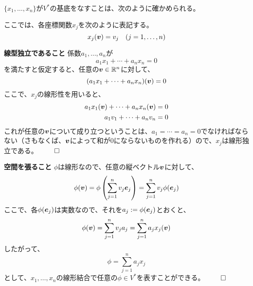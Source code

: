 \documentclass[../../../topic_linear-algebra]{subfiles}
\begin{document}
\begin{handout}[補足：なぜ基底といえるのか]
  $\{ x_1, \dots, x_n \}$が$V^*$の基底をなすことは、次のように確かめられる。
  
  ここでは、各座標関数$x_j$を次のように表記する。
    \begin{equation*}
      x_j(\vb*{v}) = v_j \quad (j = 1, \dots, n)
    \end{equation*}
  
  \begin{subpattern}{\bfseries 線型独立であること}
    係数$a_1, \dots, a_n$が
    \begin{equation*}
      a_1 x_1 + \cdots + a_n x_n = 0
    \end{equation*}
    を満たすと仮定すると、任意の$\vb*{v} \in \mathbb{R}^n$に対して、
    \begin{equation*}
      (a_1 x_1 + \cdots + a_n x_n)(\vb*{v}) = 0
    \end{equation*}
    ここで、$x_j$の線形性を用いると、
    \begin{align*}
      a_1 x_1(\vb*{v}) + \cdots + a_n x_n(\vb*{v}) & = 0 \\
      a_1 v_1 + \cdots + a_n v_n & = 0
    \end{align*}
    これが任意の$\vb*{v}$について成り立つということは、$a_1 = \cdots = a_n = 0$でなければならない（さもなくば、$\vb*{v}$によって和が0にならないものを作れる）ので、${x_j}$は線形独立である。 $\qed$
  \end{subpattern}
  
  \begin{subpattern}{\bfseries 空間を張ること}
    $\phi$は線形なので、任意の縦ベクトル$\vb*{v}$に対して、
    \begin{equation*}
      \phi(\vb*{v}) = \phi \left( \sum_{j=1}^n v_j \vb*{e}_j \right) 
      = \sum_{j=1}^n v_j \phi(\vb*{e}_j)
    \end{equation*}
    ここで、各$\phi(\vb*{e}_j)$は実数なので、それを$a_j := \phi(\vb*{e}_j)$とおくと、
    \begin{equation*}
      \phi(\vb*{v}) = \sum_{j=1}^n v_j a_j = \sum_{j=1}^n a_j x_j(\vb*{v})
    \end{equation*}
    したがって、
    \begin{equation*}
      \phi = \sum_{j=1}^n a_j x_j
    \end{equation*}
    として、${x_1, \dots, x_n}$の線形結合で任意の$\phi \in V^*$を表すことができる。 $\qed$
  \end{subpattern}
\end{handout}
\end{document}

